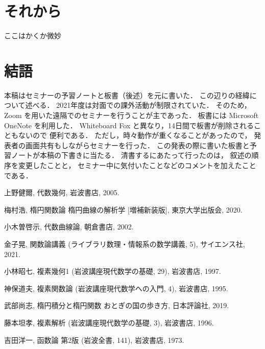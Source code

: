 \documentclass[11pt, a4paper, dvipdfmx, draft]{jsarticle}
\theoremstyle{definition}
\theoremstyle{mystyle}
\numberwithin{equation}{section} %
\begin{document}
\section{それから}
ここはかくか微妙
\section{結語}
本稿はセミナーの予習ノートと板書（後述）を元に書いた．
この辺りの経緯について述べる．
2021年度は対面での課外活動が制限されていた．
そのため，Zoom を用いた遠隔でのセミナーを行うことが主であった．
板書には Microsoft OneNote を利用した．
Whiteboard Fox と異なり，14日間で板書が削除されることもないので
便利である．
ただし，時々動作が重くなることがあったので，
発表者の画面共有もしながらセミナーを行った．
この発表の際に書いた板書と予習ノートが本稿の下書きに当たる．
清書するにあたって行ったのは，
叙述の順序を変更したことと，
セミナー中に気付いたことなどのコメントを加えたことである．




\begin{thebibliography}{15}

     上野健爾, 代数幾何, 岩波書店, 2005.

     梅村浩, 楕円関数論 楕円曲線の解析学 [増補新装版], 東京大学出版会, 2020.

     小木曽啓示, 代数曲線論, 朝倉書店, 2002.

     金子晃, 関数論講義 (ライブラリ数理・情報系の数学講義, 5), サイエンス社, 2021.

     小林昭七, 複素幾何1 (岩波講座現代数学の基礎, 29), 岩波書店, 1997.

     神保道夫, 複素関数論 (岩波講座現代数学への入門, 4), 岩波書店, 1995.

     武部尚志, 楕円積分と楕円関数 おとぎの国の歩き方, 日本評論社, 2019.

     藤本坦孝, 複素解析 (岩波講座現代数学の基礎, 3), 岩波書店, 1996.

     吉田洋一, 函数論 第2版 (岩波全書, 141), 岩波書店, 1973.


\end{thebibliography}
\end{document}
